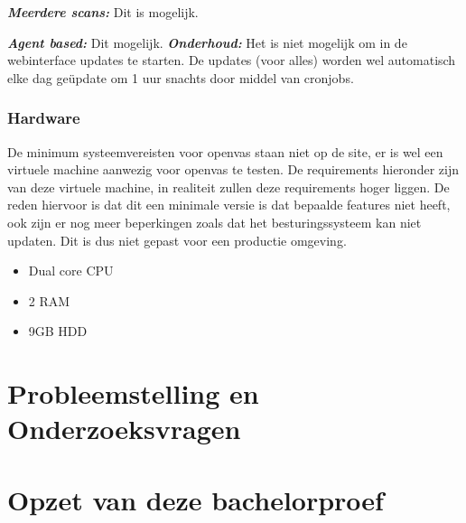 \textbf{\textit{Meerdere scans: }} Dit is mogelijk.

\textbf{\textit{Agent based: }} Dit mogelijk.
\textbf{\textit{Onderhoud: }} Het is niet mogelijk om in de webinterface updates te starten. De updates (voor alles) worden wel automatisch elke dag geüpdate om 1 uur snachts door middel van cronjobs.

\subsubsection{Hardware}
De minimum systeemvereisten voor openvas staan niet op de site, er is wel een virtuele machine aanwezig voor openvas te testen. De requirements hieronder zijn van deze virtuele machine, in realiteit zullen deze requirements hoger liggen. De reden hiervoor is dat dit een minimale versie is dat bepaalde features niet heeft, ook zijn er nog meer beperkingen zoals dat het besturingssysteem kan niet updaten. Dit is dus niet gepast voor een productie omgeving.

\begin{itemize}
\item Dual core CPU
\item 2 RAM
\item 9GB HDD
\end{itemize}

\textcite{Openvas-requirements}


\section{Probleemstelling en Onderzoeksvragen}
\label{sec:onderzoeksvragen}


\section{Opzet van deze bachelorproef}
\label{sec:opzet-bachelorproef}


